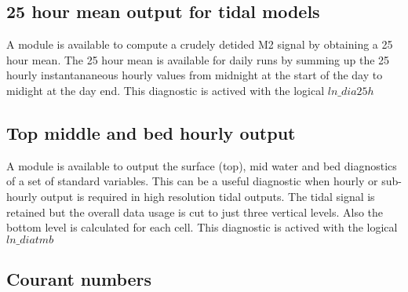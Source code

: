 \documentclass[../tex_main/NEMO_manual]{subfiles}
\begin{document}
\subsection{25 hour mean output for tidal models}



A module is available to compute a crudely detided M2 signal by obtaining a 25 hour mean.
The 25 hour mean is available for daily runs by summing up the 25 hourly instantananeous hourly values from
midnight at the start of the day to midight at the day end.
This diagnostic is actived with the logical  $ln\_dia25h$

\subsection{Top middle and bed hourly output}



A module is available to output the surface (top), mid water and bed diagnostics of a set of 
standard variables.
This can be a useful diagnostic when hourly or sub-hourly output is required in 
high resolution tidal outputs.
The tidal signal is retained but the overall data usage is cut to just three vertical levels.
Also the bottom level is calculated for each cell.
This diagnostic is actived with the logical  $ln\_diatmb$

\subsection{Courant numbers}
\end{document}
